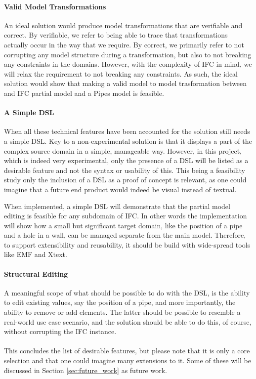 \paragraph{Valid Model Transformations}
An ideal solution would produce model transformations that are verifiable and correct. By verifiable, we refer to being able to trace that transformations actually occur in the way that we require. By correct, we primarily refer to not corrupting any model structure during a transformation, but also to not breaking any constraints in the domains. However, with the complexity of IFC in mind, we will relax the requirement to not breaking any constraints. As such, the ideal solution would show that making a valid model to model trasformation between and IFC partial model and a Pipes model is feasible.

\paragraph{A Simple DSL}
When all these technical features have been accounted for the solution still needs a simple DSL. Key to a non-experimental solution is that it displays a part of the complex source domain in a simple, manageable way. However, in this project, which is indeed very experimental, only the presence of a DSL will be listed as a desirable feature and not the syntax or usability of this. This being a feasibility study only the inclusion of a DSL as a proof of concept is relevant, as one could imagine that a future end product would indeed be visual instead of textual.

When implemented, a simple DSL will demonstrate that the partial model editing is feasible for any subdomain of IFC. In other words the implementation will show how a small but significant target domain, like the position of a pipe and a hole in a wall, can be managed separate from the main model. Therefore, to support extensibility and reusability, it should be build with wide-spread tools like EMF and Xtext.

\paragraph{Structural Editing}
A meaningful scope of what should be possible to do with the DSL, is the ability to edit existing values, say the position of a pipe, and more importantly, the ability to remove or add elements. The latter should be possible to resemble a real-world use case scenario, and the solution should be able to do this, of course, without corrupting the IFC instance.
\paragraph{}
This concludes the list of desirable features, but please note that it is only a core selection and that one could imagine many extensions to it. Some of these will be discussed in Section \ref{sec:future_work} as future work. 

